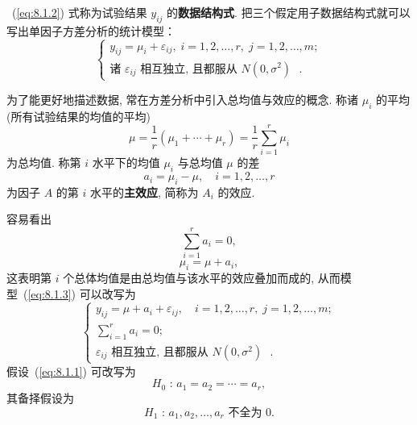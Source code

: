 ~(\ref{eq:8.1.2}) 式称为试验结果 $y_{ij}$ 的\textbf{数据结构式}. 把三个假定用子数据结构式就可以写出单因子方差分析的统计模型：
\begin{equation}
  \label{eq:8.1.3}
  \begin{cases}
    y_{ij}  = \mu_i + \varepsilon_{ij}, \; i = 1,2,\ldots,r,\; j = 1,2,\ldots,m; \\
    \text{诸 $\varepsilon_{ij}$ 相互独立, 且都服从 $N(0,\sigma^2)$ }.
  \end{cases}
\end{equation}

为了能更好地描述数据, 常在方差分析中引入总均值与效应的概念. 称诸 $\mu_i$ 的平均(所有试验结果的均值的平均)
\begin{equation}
  \label{eq.8.1.4}
  \mu = \frac{1}{r} (\mu_1 + \cdots + \mu_r) = \frac{1}{r} \sum_{i=1}^{r} \mu_i
\end{equation}
为总均值. 称第 $i$ 水平下的均值 $\mu_i$ 与总均值 $\mu$ 的差
\begin{equation}
  \label{eq:8.1.5}
  a_i = \mu_i - \mu, \quad i = 1,2,\ldots,r
\end{equation}
为因子 $A$ 的第 $i$ 水平的\textbf{主效应}, 简称为 $A_i$ 的效应. 

容易看出 
\begin{equation}
  \label{eq:8.1.6}
  \sum_{i=1}^{r} a_i = 0,
\end{equation}
\begin{equation}
  \label{eq:8.1.7}
  \mu_i = \mu + a_i,
\end{equation}
这表明第 $i$ 个总体均值是由总均值与该水平的效应叠加而成的, 从而模型~(\ref{eq:8.1.3}) 可以改写为
\begin{equation}
  \label{eq:8.1.8}
  \begin{cases}
    y_{ij}  = \mu + a_i + \varepsilon_{ij}, \quad i = 1,2,\ldots,r,\; j = 1,2,\ldots,m; \\
    \sum\limits_{i=1}^{r} a_i = 0; \\
    \text{$\varepsilon_{ij}$ 相互独立, 且都服从 $N(0,\sigma^2)$ }.
  \end{cases}
\end{equation}
假设~(\ref{eq:8.1.1}) 可改写为 
\begin{equation}
  H_0 \textrm{ : } a_1 = a_2 = \cdots = a_r,\label{eq:8.1.9}
\end{equation}
其备择假设为
\begin{equation*}
  H_1 \text{ : } a_1,a_2,\ldots,a_r \text{ 不全为 0.}
\end{equation*}

